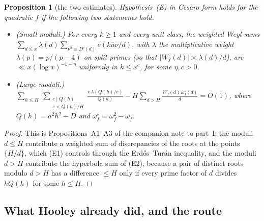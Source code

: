 \documentclass[11pt,a4paper]{article}
\newtheorem{proposition}[theorem]{Proposition}
\theoremstyle{remark}\newtheorem{remark}[theorem]{Remark}
\begin{document}
\begin{proposition}[the two estimates]\label{prop:AB}
Hypothesis~(E) in Ces\`aro form holds for the quadratic $f$ if the following two statements hold.
\begin{itemize}
\item[(E1)] (Small moduli.) For every $k\ge1$ and every unit class, the weighted Weyl sums
$\sum_{d\le x}\lambda(d)\sum_{\nu^2\equiv D'(d)}e(k\bar u\nu/d)$, with $\lambda$ the multiplicative weight
$\lambda(p)=p/(p-4)$ on split primes (so that $|W_f(d)|\asymp\lambda(d)/d$), are $\ll x(\log x)^{-1-\eta}$
uniformly in $k\le x^{c}$, for some $\eta,c>0$.
\item[(E2)] (Large moduli.) $\displaystyle\sum_{h\le H}\ \sum_{\substack{e\mid Q(h)\\ e<Q(h)/H}}\frac{e\,\lambda(Q(h)/e)}{Q(h)}
-H\sum_{d>H}\frac{W_f(d)\,\omega^\circ_f(d)}{d}=O(1)$, where $Q(h)=a^2h^2-D$ and $\omega_f^\circ=\omega_f^2-\omega_f$.
\end{itemize}
\end{proposition}
\begin{proof}
This is Propositions~A1--A3 of the companion note to part~I: the moduli $d\le H$ contribute a weighted sum
of discrepancies of the roots at the points $\{H/d\}$, which (E1) controls through the Erd\H os--Tur\'an
inequality, and the moduli $d>H$ contribute the hyperbola sum of (E2), because a pair of distinct roots
modulo $d>H$ has a difference $\le H$ only if every prime factor of $d$ divides $hQ(h)$ for some $h\le H$.
\end{proof}

\subsection{What Hooley already did, and the route}
\end{document}
